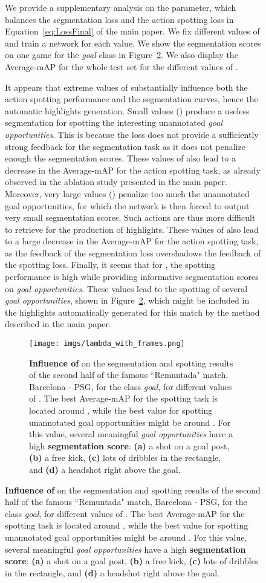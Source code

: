 \documentclass[10pt,twocolumn,letterpaper]{article}
\begin{document}
\begin{figure}[t]
{\begin{minipage}{\linewidth}
 We provide a supplementary analysis on the  parameter, which balances the segmentation loss and the action spotting loss in Equation~\ref{eq:LossFinal} of the main paper.
We fix different values of  and train a network for each value. We show the segmentation scores on one game for the \emph{goal} class in Figure~\ref{fig:lambdaAnalysis}. We also display the Average-mAP for the whole test set for the different values of .

It appears that extreme values of  substantially influence both the action spotting performance and the segmentation curves, hence the automatic highlights generation. Small values (\ie ) produce a useless segmentation for spotting the interesting unannotated \emph{goal opportunities}. This is because the loss does not provide a sufficiently strong feedback for the segmentation task as it does not penalize enough the segmentation scores. These values of  also lead to a decrease in the Average-mAP for the action spotting task, as already observed in the ablation study presented in the main paper. Moreover, very large values () penalize too much the unannotated goal opportunities, for which the network is then forced to output very small segmentation scores. Such actions are thus more difficult to retrieve for the production of highlights. These values of  also lead to a large decrease in the Average-mAP for the action spotting task, as the feedback of the segmentation loss overshadows the feedback of the spotting loss. Finally, it seems that for , the spotting performance is high while providing informative segmentation scores on \emph{goal opportunities}. These values lead to the spotting of several \emph{goal opportunities}, shown in Figure~\ref{fig:lambdaAnalysis}, which might be included in the highlights automatically generated for this match by the method described in the main paper.


\begin{figure}
    \centering
    \texttt{[image: imgs/lambda\_with\_frames.png]}
    \caption{\textbf{Influence of } on the segmentation and spotting results of the second half of the famous ``Remuntada" match, Barcelona - PSG, for the class \emph{goal}, for different values of . The best Average-mAP for the spotting task is located around , while the best value for spotting unannotated goal opportunities might be around . For this value, several meaningful \emph{goal opportunities} have a high \textbf{\color{orange}segmentation score}: \textbf{(a)} a shot on a goal post, \textbf{(b)} a free kick, \textbf{(c)} lots of dribbles in the rectangle, and \textbf{(d)} a headshot right above the goal.
    }
    \label{fig:lambdaAnalysis}
\end{figure}








\end{minipage}}
\end{figure}
\end{document}
